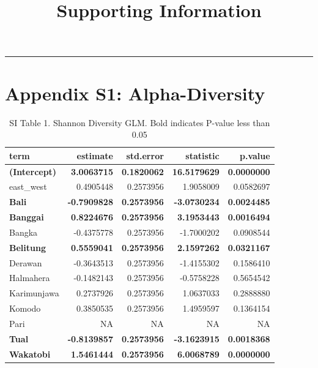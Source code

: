 \documentclass[
]{article}
\title{Supporting Information}
\author{}
\date{\vspace{-2.5em}}
\begin{document}
\maketitle

\begin{center}\rule{0.5\linewidth}{0.5pt}\end{center}

\hypertarget{appendix-s1-alpha-diversity}{%
\section{Appendix S1:
Alpha-Diversity}\label{appendix-s1-alpha-diversity}}

\begin{table}

\caption{\label{tab:unnamed-chunk-1}SI Table 1. Shannon Diversity GLM. Bold indicates P-value less than 0.05}
\centering
\begin{tabular}[t]{l|r|r|r|r}
\hline
term & estimate & std.error & statistic & p.value\\
\hline
\textbf{(Intercept)} & \textbf{3.0063715} & \textbf{0.1820062} & \textbf{16.5179629} & \textbf{0.0000000}\\
\hline
east\_west & 0.4905448 & 0.2573956 & 1.9058009 & 0.0582697\\
\hline
\textbf{Bali} & \textbf{-0.7909828} & \textbf{0.2573956} & \textbf{-3.0730234} & \textbf{0.0024485}\\
\hline
\textbf{Banggai} & \textbf{0.8224676} & \textbf{0.2573956} & \textbf{3.1953443} & \textbf{0.0016494}\\
\hline
Bangka & -0.4375778 & 0.2573956 & -1.7000202 & 0.0908544\\
\hline
\textbf{Belitung} & \textbf{0.5559041} & \textbf{0.2573956} & \textbf{2.1597262} & \textbf{0.0321167}\\
\hline
Derawan & -0.3643513 & 0.2573956 & -1.4155302 & 0.1586410\\
\hline
Halmahera & -0.1482143 & 0.2573956 & -0.5758228 & 0.5654542\\
\hline
Karimunjawa & 0.2737926 & 0.2573956 & 1.0637033 & 0.2888880\\
\hline
Komodo & 0.3850535 & 0.2573956 & 1.4959597 & 0.1364154\\
\hline
Pari & NA & NA & NA & NA\\
\hline
\textbf{Tual} & \textbf{-0.8139857} & \textbf{0.2573956} & \textbf{-3.1623915} & \textbf{0.0018368}\\
\hline
\textbf{Wakatobi} & \textbf{1.5461444} & \textbf{0.2573956} & \textbf{6.0068789} & \textbf{0.0000000}\\

\end{tabular}
\end{table}
\end{document}
